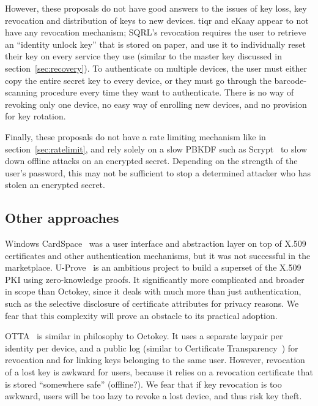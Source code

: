 However, these proposals do not have good answers to the issues of key loss, key revocation and
distribution of keys to new devices. tiqr and eKaay appear to not have any revocation mechanism;
SQRL's revocation requires the user to retrieve an ``identity unlock key'' that is stored on paper,
and use it to individually reset their key on every service they use (similar to the master key
discussed in section~\ref{sec:recovery}). To authenticate on multiple devices, the user must either
copy the entire secret key to every device, or they must go through the barcode-scanning procedure
every time they want to authenticate. There is no way of revoking only one device, no easy way of
enrolling new devices, and no provision for key rotation.

Finally, these proposals do not have a rate limiting mechanism like in section~\ref{sec:ratelimit},
and rely solely on a slow PBKDF such as Scrypt~\cite{Percival09} to slow down offline attacks on an
encrypted secret. Depending on the strength of the user's password, this may not be sufficient to
stop a determined attacker who has stolen an encrypted secret.

\subsection{Other approaches}

Windows CardSpace~\cite{Chappell06} was a user interface and abstraction layer on top of X.509
certificates and other authentication mechanisms, but it was not successful in the marketplace.
U-Prove~\cite{Paquin13} is an ambitious project to build a superset of the X.509 PKI using
zero-knowledge proofs. It significantly more complicated and broader in scope than Octokey, since it
deals with much more than just authentication, such as the selective disclosure of certificate
attributes for privacy reasons. We fear that this complexity will prove an obstacle to its practical
adoption.

OTTA~\cite{Thomas14} is similar in philosophy to Octokey. It uses a separate keypair per identity
per device, and a public log (similar to Certificate Transparency~\cite{CertTrans}) for revocation
and for linking keys belonging to the same user. However, revocation of a lost key is awkward for
users, because it relies on a revocation certificate that is stored ``somewhere safe'' (offline?).
We fear that if key revocation is too awkward, users will be too lazy to revoke a lost device, and
thus risk key theft.

